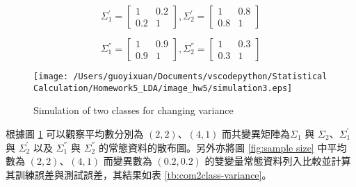 \begin{itemize}
$$ \Sigma_1^{'} = \left[
            \begin{array}{clr}
                1 & 0.2  \\
                0.2 & 1
            \end{array} \right] ,
            \Sigma_2^{'} = \left[
            \begin{array}{clr}
                1 & 0.8  \\
                0.8 & 1 
            \end{array} \right]  $$
       
$$ \Sigma_1^{''} = \left[
            \begin{array}{clr}
                1 & 0.9  \\
                0.9 & 1
            \end{array} \right] ,
            \Sigma_2^{''} = \left[
            \begin{array}{clr}
                1 & 0.3  \\
                0.3 & 1 
            \end{array} \right]  $$
            
\begin{figure}[H]
    \centering
        \texttt{[image: /Users/guoyixuan/Documents/vscodepython/Statistical Calculation/Homework5\_LDA/image\_hw5/simulation3.eps]}
    \caption{Simulation of two classes for changing variance}
    \label{fig:variance}
\end{figure} 

根據圖 \ref{fig:variance} 可以觀察平均數分別為 $(2,2)$、$(4,1)$ 而共變異矩陣為$\Sigma_1$ 與 $\Sigma_2$、$\Sigma_1^{'}$ 與 $\Sigma_2^{'}$ 以及 $\Sigma_1^{''}$ 與 $\Sigma_2^{''}$ 的常態資料的散布圖。另外亦將圖 \ref{fig:sample size} 中平均數為 $(2,2)$、$(4,1)$ 而變異數為 $(0.2,0.2)$ 的雙變量常態資料列入比較並計算其訓練誤差與測試誤差，其結果如表 \ref{tb:com2class-variance}。


\end{itemize}
